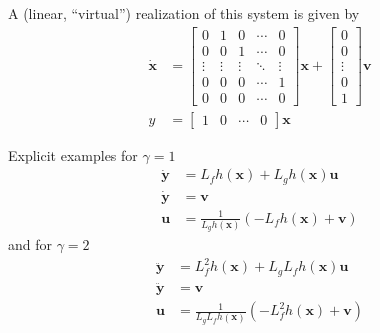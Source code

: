 A (linear, ``virtual'') realization of this system is given by
\begin{align*}
    \dot{\mathbf{x}} & = \begin{bmatrix}
                             0      & 1      & 0      & \cdots & 0      \\
                             0      & 0      & 1      & \cdots & 0      \\
                             \vdots & \vdots & \vdots & \ddots & \vdots \\
                             0      & 0      & 0      & \cdots & 1      \\
                             0      & 0      & 0      & \cdots & 0
                         \end{bmatrix}
    \mathbf{x} +
    \begin{bmatrix}
        0      \\
        0      \\
        \vdots \\
        0      \\
        1
    \end{bmatrix}
    \mathbf{v}                                                      \\
    y                & = \begin{bmatrix}
                             1 & 0 & \cdots & 0
                         \end{bmatrix}
    \mathbf{x}
\end{align*}

\newpar{}
Explicit examples for $\gamma = 1$ %
\begin{align*}
    \dot{\mathbf{y}\mathbf{}} & = L_f h(\mathbf{x}) + L_g h(\mathbf{x}) \mathbf{u}             \\
    \dot{\mathbf{y}}          & = \mathbf{v}                                                   \\
    \mathbf{u}                & = \frac{1}{L_g h(\mathbf{x})}(-L_f h(\mathbf{x}) + \mathbf{v})
\end{align*}
and for $\gamma = 2$
\begin{align*}
    \ddot{\mathbf{y}} & = L_f^2 h(\mathbf{x}) + L_g L_f h(\mathbf{x}) \mathbf{u}             \\
    \ddot{\mathbf{y}} & = \mathbf{v}                                                         \\
    \mathbf{u}        & = \frac{1}{L_g L_f h(\mathbf{x})}(-L_f^2 h(\mathbf{x}) + \mathbf{v})
\end{align*}

